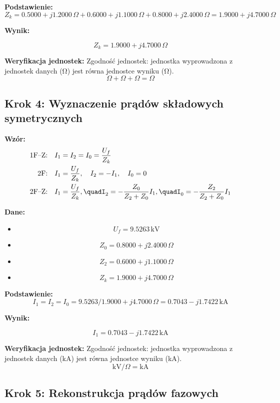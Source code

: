 \documentclass[11pt,a4paper]{article}
\begin{document}
\textbf{Podstawienie:}
$$
Z_k = 0.5000 + j1.2000\,\Omega + 0.6000 + j1.1000\,\Omega + 0.8000 + j2.4000\,\Omega = 1.9000 + j4.7000\,\Omega
$$

\textbf{Wynik:}
\begin{center}
$$
Z_k = 1.9000 + j4.7000\,\Omega
$$
\end{center}

\textbf{Weryfikacja jednostek:} Zgodność jednostek: jednostka wyprowadzona z jednostek danych (Ω) jest równa jednostce wyniku (Ω).
$$
\Omega + \Omega + \Omega = \Omega
$$

\subsection{Krok 4: Wyznaczenie prądów składowych symetrycznych}

\textbf{Wzór:}
$$
\begin{aligned}\text{1F–Z:} \quad & I_1 = I_2 = I_0 = \frac{U_f}{Z_k} \\\text{2F:} \quad & I_1 = \frac{U_f}{Z_k}, \quad I_2 = -I_1, \quad I_0 = 0 \\\text{2F–Z:} \quad & I_1 = \frac{U_f}{Z_k}, \quadI_2 = -\frac{Z_0}{Z_2 + Z_0} I_1, \quadI_0 = -\frac{Z_2}{Z_2 + Z_0} I_1\end{aligned}
$$

\textbf{Dane:}
\begin{itemize}
  \item
$$
U_f = 9.5263\,\mathrm{kV}
$$
  \item
$$
Z_0 = 0.8000 + j2.4000\,\Omega
$$
  \item
$$
Z_2 = 0.6000 + j1.1000\,\Omega
$$
  \item
$$
Z_k = 1.9000 + j4.7000\,\Omega
$$
\end{itemize}

\textbf{Podstawienie:}
$$
I_1 = I_2 = I_0 = 9.5263 / 1.9000 + j4.7000\,\Omega = 0.7043 - j1.7422\,\mathrm{kA}
$$

\textbf{Wynik:}
\begin{center}
$$
I_1 = 0.7043 - j1.7422\,\mathrm{kA}
$$
\end{center}

\textbf{Weryfikacja jednostek:} Zgodność jednostek: jednostka wyprowadzona z jednostek danych (kA) jest równa jednostce wyniku (kA).
$$
\mathrm{kV}/\Omega = \mathrm{kA}
$$

\subsection{Krok 5: Rekonstrukcja prądów fazowych}
\end{document}
